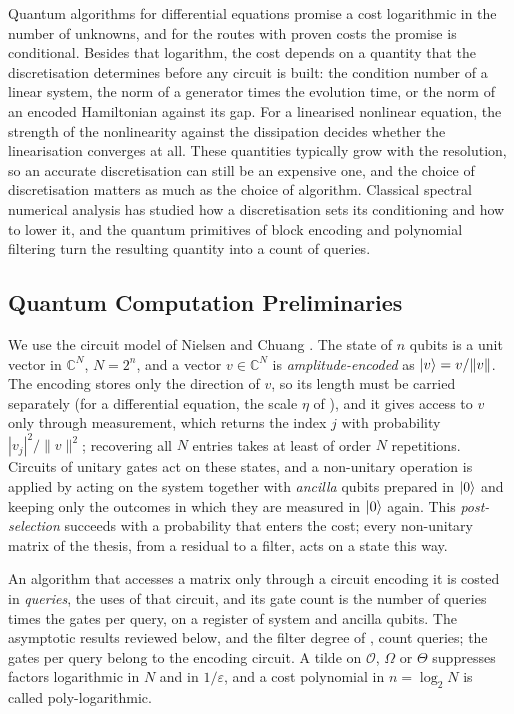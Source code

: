 Quantum algorithms for differential equations promise a cost logarithmic in the number of unknowns, and for the routes with proven costs the promise is conditional. Besides that logarithm, the cost depends on a quantity that the discretisation determines before any circuit is built: the condition number of a linear system, the norm of a generator times the evolution time, or the norm of an encoded Hamiltonian against its gap. For a linearised nonlinear equation, the strength of the nonlinearity against the dissipation decides whether the linearisation converges at all. These quantities typically grow with the resolution, so an accurate discretisation can still be an expensive one, and the choice of discretisation matters as much as the choice of algorithm. Classical spectral numerical analysis has studied how a discretisation sets its conditioning and how to lower it, and the quantum primitives of block encoding and polynomial filtering turn the resulting quantity into a count of queries.

\subsection{Quantum Computation Preliminaries}
\label{sec:bg-qc}

We use the circuit model of Nielsen and Chuang \cite{nielsenchuang2010}. The state of $n$ qubits is a unit vector in $\mathbb{C}^N$, $N=2^n$, and a vector $v\in\mathbb{C}^N$ is \emph{amplitude-encoded} as $\ket{v}=v/\|v\|$. The encoding stores only the direction of $v$, so its length must be carried separately (for a differential equation, the scale $\eta$ of ), and it gives access to $v$ only through measurement, which returns the index $j$ with probability $|v_j|^2/\|v\|^2$; recovering all $N$ entries takes at least of order $N$ repetitions. Circuits of unitary gates act on these states, and a non-unitary operation is applied by acting on the system together with \emph{ancilla} qubits prepared in $\ket{0}$ and keeping only the outcomes in which they are measured in $\ket{0}$ again. This \emph{post-selection} succeeds with a probability that enters the cost; every non-unitary matrix of the thesis, from a residual to a filter, acts on a state this way.

An algorithm that accesses a matrix only through a circuit encoding it is costed in \emph{queries}, the uses of that circuit, and its gate count is the number of queries times the gates per query, on a register of system and ancilla qubits. The asymptotic results reviewed below, and the filter degree of , count queries; the gates per query belong to the encoding circuit. A tilde on $\mathcal O$, $\Omega$ or $\Theta$ suppresses factors logarithmic in $N$ and in $1/\varepsilon$, and a cost polynomial in $n=\log_2N$ is called poly-logarithmic.

